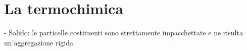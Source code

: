 \section{La termochimica}
- Solido: le particelle costituenti sono strettamente impacchettate e ne risulta un'aggregazione rigida
